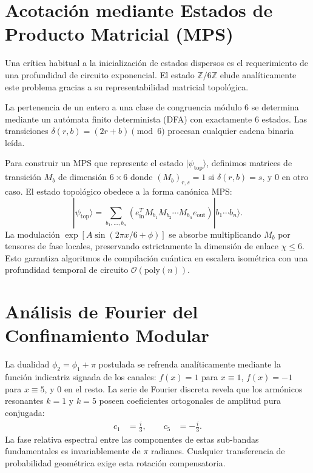 \documentclass[12pt,a4paper]{article}
\theoremstyle{plain}
\theoremstyle{definition}
\theoremstyle{remark}
\begin{document}
\appendix

\section{Acotación mediante Estados de Producto Matricial (MPS)}
\label{app:mps}

Una crítica habitual a la inicialización de estados dispersos es el requerimiento de una profundidad de circuito exponencial. El estado $\mathbb{Z}/6\mathbb{Z}$ elude analíticamente este problema gracias a su representabilidad matricial topológica.

La pertenencia de un entero a una clase de congruencia módulo $6$ se determina mediante un autómata finito determinista (DFA) con exactamente $6$ estados. Las transiciones $\delta(r,b) = (2r+b) \pmod 6$ procesan cualquier cadena binaria leída.

Para construir un MPS que represente el estado $|\psi_{\text{top}}\rangle$, definimos matrices de transición $M_b$ de dimensión $6\times 6$ donde $(M_b)_{r,s} = 1$ si $\delta(r,b) = s$, y $0$ en otro caso. El estado topológico obedece a la forma canónica MPS:
\begin{equation}
|\psi_{\text{top}}\rangle = \sum_{b_1,\dots,b_n} \left( e_{\text{in}}^T M_{b_1} M_{b_2} \cdots M_{b_n} e_{\text{out}} \right) |b_1\cdots b_n\rangle.
\end{equation}
La modulación $\exp[A\sin(2\pi x/6 + \phi)]$ se absorbe multiplicando $M_b$ por tensores de fase locales, preservando estrictamente la dimensión de enlace $\chi \le 6$. Esto garantiza algoritmos de compilación cuántica en escalera isométrica con una profundidad temporal de circuito $\mathcal{O}(\text{poly}(n))$.

\section{Análisis de Fourier del Confinamiento Modular}
\label{app:fourier}

La dualidad $\phi_2 = \phi_1 + \pi$ postulada se refrenda analíticamente mediante la función indicatriz signada de los canales: $f(x) = 1$ para $x \equiv 1$, $f(x) = -1$ para $x \equiv 5$, y $0$ en el resto. La serie de Fourier discreta revela que los armónicos resonantes $k=1$ y $k=5$ poseen coeficientes ortogonales de amplitud pura conjugada:
\begin{align}
c_1 &= \frac{i}{3}, \qquad c_5 &= -\frac{i}{3}.
\end{align}
La fase relativa espectral entre las componentes de estas sub-bandas fundamentales es invariablemente de $\pi$ radianes. Cualquier transferencia de probabilidad geométrica exige esta rotación compensatoria.
\end{document}
